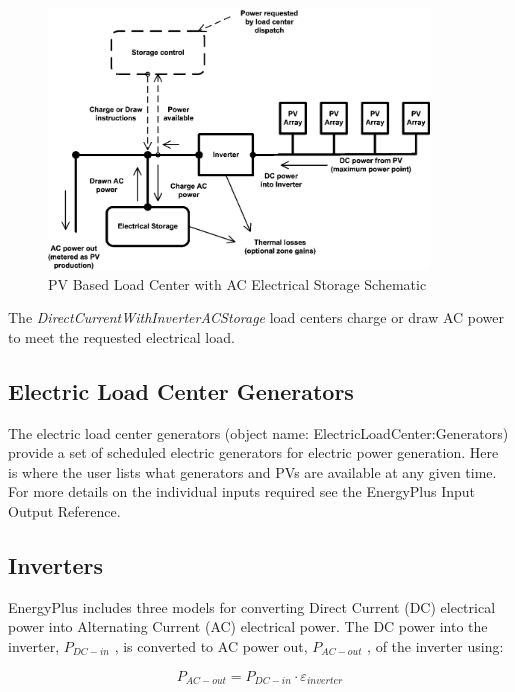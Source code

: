 \begin{figure}[hbtp] %
\centering
\includegraphics[width=0.9\textwidth, height=0.9\textheight, keepaspectratio=true]{media/image7484.png}
\caption{PV Based Load Center with AC Electrical Storage Schematic \protect \label{fig:pv-based-load-center-with-ac-electrical}}
\end{figure}

The \emph{DirectCurrentWithInverterACStorage} load centers charge or draw AC power to meet the requested electrical load.

\subsection{Electric Load Center Generators}\label{electric-load-center-generators}

The electric load center generators (object name: ElectricLoadCenter:Generators) provide a set of scheduled electric generators for electric power generation. Here is where the user lists what generators and PVs are available at any given time. For more details on the individual inputs required see the EnergyPlus Input Output Reference.

\subsection{Inverters}\label{inverters}

EnergyPlus includes three models for converting Direct Current (DC) electrical power into Alternating Current (AC) electrical power. The DC power into the inverter, \({P_{DC - in}}\) , is converted to AC power out, \({P_{AC - out}}\) , of the inverter using:

\begin{equation}
{P_{AC - out}} = {P_{DC - in}} \cdot {\varepsilon_{inverter}}
\end{equation}

